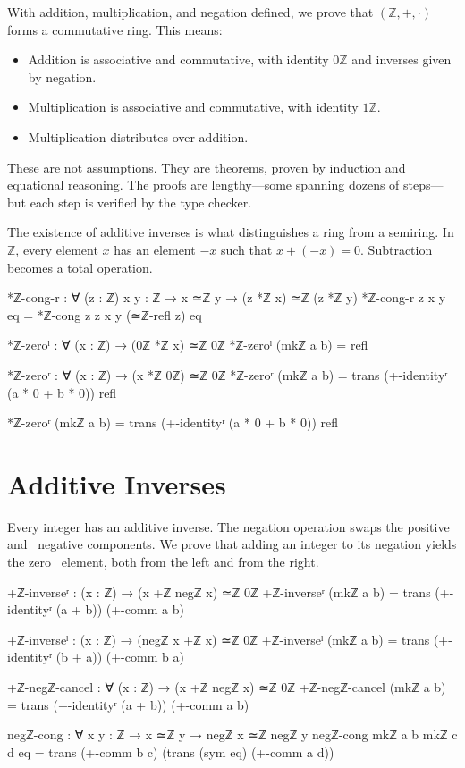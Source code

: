 \documentclass[11pt,a4paper]{book}
\begin{document}
With addition, multiplication, and negation defined, we prove that $(\mathbb{Z}, +, \cdot)$ 
forms a commutative ring. This means:
\begin{itemize}
\item Addition is associative and commutative, with identity $0\mathbb{Z}$ and 
  inverses given by negation.
\item Multiplication is associative and commutative, with identity $1\mathbb{Z}$.
\item Multiplication distributes over addition.
\end{itemize}

These are not assumptions. They are theorems, proven by induction and equational reasoning. 
The proofs are lengthy—some spanning dozens of steps—but each step is verified by the 
type checker.

The existence of additive inverses is what distinguishes a ring from a semiring. In $\mathbb{Z}$, 
every element $x$ has an element $-x$ such that $x + (-x) = 0$. Subtraction becomes 
a total operation.

\begin{code}
*ℤ-cong-r : ∀ (z : ℤ) {x y : ℤ} → x ≃ℤ y → (z *ℤ x) ≃ℤ (z *ℤ y)
*ℤ-cong-r z {x} {y} eq = *ℤ-cong {z} {z} {x} {y} (≃ℤ-refl z) eq

*ℤ-zeroˡ : ∀ (x : ℤ) → (0ℤ *ℤ x) ≃ℤ 0ℤ
*ℤ-zeroˡ (mkℤ a b) = refl

*ℤ-zeroʳ : ∀ (x : ℤ) → (x *ℤ 0ℤ) ≃ℤ 0ℤ
*ℤ-zeroʳ (mkℤ a b) = 
  trans (+-identityʳ (a * 0 + b * 0)) refl
\end{code}
*ℤ-zeroʳ (mkℤ a b) = 
  trans (+-identityʳ (a * 0 + b * 0)) refl

\section{Additive Inverses}

Every integer has an additive inverse. The negation operation swaps the positive and \
negative components. We prove that adding an integer to its negation yields the zero \
element, both from the left and from the right.

\begin{code}
+ℤ-inverseʳ : (x : ℤ) → (x +ℤ negℤ x) ≃ℤ 0ℤ
+ℤ-inverseʳ (mkℤ a b) = trans (+-identityʳ (a + b)) (+-comm a b)

+ℤ-inverseˡ : (x : ℤ) → (negℤ x +ℤ x) ≃ℤ 0ℤ
+ℤ-inverseˡ (mkℤ a b) = trans (+-identityʳ (b + a)) (+-comm b a)

+ℤ-negℤ-cancel : ∀ (x : ℤ) → (x +ℤ negℤ x) ≃ℤ 0ℤ
+ℤ-negℤ-cancel (mkℤ a b) = trans (+-identityʳ (a + b)) (+-comm a b)

negℤ-cong : ∀ {x y : ℤ} → x ≃ℤ y → negℤ x ≃ℤ negℤ y
negℤ-cong {mkℤ a b} {mkℤ c d} eq = 
  trans (+-comm b c) (trans (sym eq) (+-comm a d))
\end{code}
\end{document}
